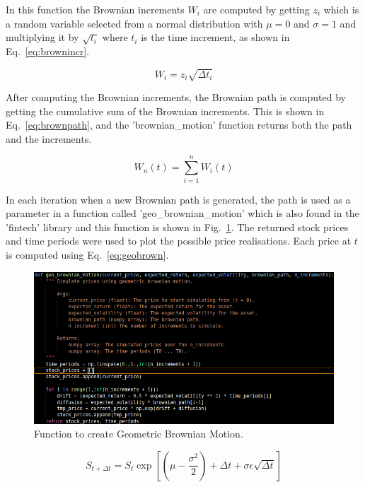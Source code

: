 \noindent
In this function the Brownian increments $W_i$ are computed by getting $z_i$ which is a random variable selected from a normal distribution with $\mu=0$ and $\sigma=1$ and multiplying it by $\sqrt{t_i}$ where $t_i$ is the time increment, as shown in Eq.~\ref{eq:brownincr}.  

\begin{equation} \label{eq:brownincr}
    W_i = z_i \sqrt{\Delta t_i}
\end{equation}

\noindent
After computing the Brownian increments, the Brownian path is computed by getting the cumulative sum of the Brownian increments. This is shown in Eq.~\ref{eq:brownpath}, and the 'brownian\_motion' function returns both the path and the increments. 
 
\begin{equation} \label{eq:brownpath}
    W_n(t) = \sum_{i=1}^{n} W_i(t)
\end{equation}

\noindent
In each iteration when a new Brownian path is generated, the path is used as a parameter in a function called 'geo\_brownian\_motion' which is also found in the 'fintech' library and this function is shown in Fig.~\ref{fig:browngeo}. The returned stock prices and time periods were used to plot the possible price realisations. Each price at $t$ is computed using Eq.~\ref{eq:geobrown}. 

\begin{figure}[H]
\centering
  \includegraphics[scale = .64]{imgs/geo_brown_path.png}
  \caption{Function to create Geometric Brownian Motion.}
  \label{fig:browngeo}
\end{figure}

\begin{equation} \label{eq:geobrown}
    S_{t+\Delta t} = S_t \exp[(\mu - \frac{\sigma^2}{2}) + \Delta t + \sigma \epsilon \sqrt{\Delta t}] 
\end{equation}

